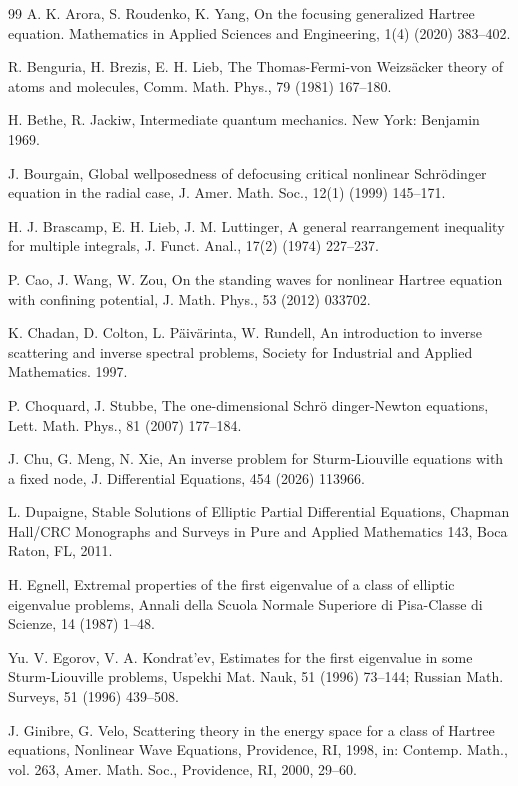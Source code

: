 \documentclass[12pt,thmsa]{article}
\begin{document}
\begin{thebibliography}{99}
 A. K. Arora, S. Roudenko, K. Yang, On the focusing
generalized Hartree equation. Mathematics in Applied Sciences and
Engineering, 1(4) (2020) 383--402.

 R. Benguria, H. Brezis, E. H. Lieb, The Thomas-Fermi-von
Weizs\"{a}cker theory of atoms and molecules, Comm. Math. Phys., 79 (1981)
167--180.

 H. Bethe, R. Jackiw, Intermediate quantum mechanics. New
York: Benjamin 1969.

 J. Bourgain, Global wellposedness of defocusing critical
nonlinear Schr\"{o}dinger equation in the radial case, J. Amer. Math. Soc.,
12(1) (1999) 145--171.

 H. J. Brascamp, E. H. Lieb, J. M. Luttinger, A general
rearrangement inequality for multiple integrals, J. Funct. Anal., 17(2)
(1974) 227--237.

 P. Cao, J. Wang, W. Zou, On the standing waves for nonlinear
Hartree equation with confining potential, J. Math. Phys., 53 (2012) 033702.

 K. Chadan, D. Colton, L. P\"aiv\"arinta, W. Rundell, An
introduction to inverse scattering and inverse spectral problems, Society
for Industrial and Applied Mathematics. 1997.

 P. Choquard, J. Stubbe, The one-dimensional Schr\"{o}%
dinger-Newton equations, Lett. Math. Phys., 81 (2007) 177--184.

 J. Chu, G. Meng, N. Xie, An inverse problem for
Sturm-Liouville equations with a fixed node, J. Differential Equations, 454
(2026) 113966.

 L. Dupaigne, Stable Solutions of Elliptic Partial
Differential Equations, Chapman Hall/CRC Monographs and Surveys in Pure and
Applied Mathematics 143, Boca Raton, FL, 2011.

 H. Egnell, Extremal properties of the first eigenvalue of a
class of elliptic eigenvalue problems, Annali della Scuola Normale Superiore
di Pisa-Classe di Scienze, 14 (1987) 1--48.

 Yu. V. Egorov, V. A. Kondrat'ev, Estimates for the first
eigenvalue in some Sturm-Liouville problems, Uspekhi Mat. Nauk, 51 (1996)
73--144; Russian Math. Surveys, 51 (1996) 439--508.

 J. Ginibre, G. Velo, Scattering theory in the energy space
for a class of Hartree equations, Nonlinear Wave Equations, Providence, RI,
1998, in: Contemp. Math., vol. 263, Amer. Math. Soc., Providence, RI, 2000,
29--60.


\end{thebibliography}
\end{document}
